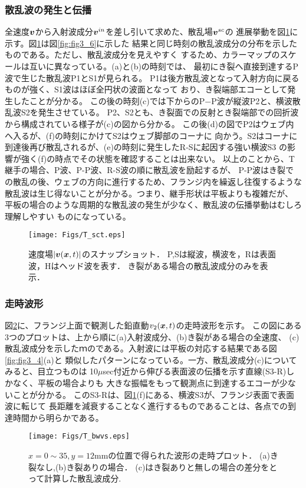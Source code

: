 \subsubsection{散乱波の発生と伝播}
全速度$\mbox{\boldmath $v$}$から入射波成分$\mbox{\boldmath $v$}^{in}$を差し引いて求めた、散乱場$\mbox{\boldmath $v$}^{sc}$の
進展挙動を図\ref{fig:fig3_7}に示す。図\ref{fig:fig3_7}は図\ref{fig:fig3_6}に示した
結果と同じ時刻の散乱波成分の分布を示したものである。ただし、散乱波成分を見えやすく
するため、カラーマップのスケールは互いに異なっている。(a)と(b)の時刻では、
最初にき裂へ直接到達するP波で生じた散乱波P1とS1が見られる。
P1は後方散乱波となって入射方向に戻るものが強く、S1波はほぼ全円状の波面となって
おり、き裂端部エコーとして発生したことが分かる。
この後の時刻(c)では下からのP−P波が縦波P2と、横波散乱波S2を発生させている。
P2、S2とも、き裂面での反射とき裂端部での回折波から構成されている様子が(c)の図から分かる。
この後(d)の図でP2はウェブ内へ入るが、(f)の時刻にかけてS2はウェブ脚部のコーナに
向かう。S2はコーナに到達後再び散乱されるが、(e)の時刻に発生したR-Sに起因する強い横波S3
の影響が強く(f)の時点でその状態を確認することは出来ない。
以上のことから、T継手の場合、P波、P-P波、R-S波の順に散乱波を励起するが、
P-P波はき裂での散乱の後、ウェブの方向に進行するため、フランジ内を繰返し往復するような
散乱波は生じ得ないことが分かる。つまり、継手形状は平板よりも複雑だが、
平板の場合のような周期的な散乱波の発生が少なく、散乱波の伝播挙動はむしろ理解しやすい
ものになっている。
\begin{figure}[h]
	\begin{center}
	\texttt{[image: Figs/T\_sct.eps]} 
	\end{center}
	\caption{
		速度場$|\mbox{\boldmath $v$}(\mbox{\boldmath $x$},t)|$のスナップショット．
		P,Sは縦波，横波を，Rは表面波，Hはヘッド波を表す．
		き裂がある場合の散乱波成分のみを表示．
	} 
	\label{fig:fig3_7}
\end{figure}
\subsubsection{走時波形}
図\ref{fig:fig3_8}に、フランジ上面で観測した鉛直動$v_2(\mbox{\boldmath $x$},t)$の走時波形を示す。
この図にある3つのプロットは、上から順に(a)入射波成分、(b)き裂がある場合の全速度、
(c)散乱波成分を示したｍのである。入射波には平板の対応する結果である図\ref{fig:fig3_4}(a)と
類似したパターンになっている。一方、散乱波成分(c)についてみると、目立つものは
10$\mu$sec付近から伸びる表面波の伝播を示す直線(S3-R)しかなく、平板の場合よりも
大きな振幅をもって観測点に到達するエコーが少ないことが分かる。
このS3-Rは、図\ref{fig:fig3_7}(f)にある、横波S3が、フランジ表面で表面波に転じて
長距離を減衰することなく進行するものであることは、各点での到達時間から明らかである。
\begin{figure}[h]
	\begin{center}
	\texttt{[image: Figs/T\_bwvs.eps]} 
	\end{center}
	\caption{
		$x=0\sim35, y=12$mmの位置で得られた波形の走時プロット．
		(a)き裂なし,(b)き裂ありの場合．
		(c)はき裂ありと無しの場合の差分をとって計算した散乱波成分.
	} 
	\label{fig:fig3_8}
\end{figure}


